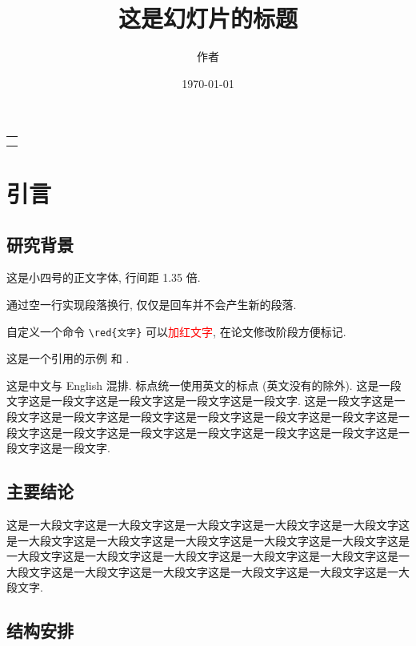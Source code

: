\documentclass[UTF8,openany]{ctexbook}
\title{这是幻灯片的标题}
\author{作者}
\date{\today}
\makeatletter
\numberwithin{equation}{chapter}
\numberwithin{figure}{chapter}
\numberwithin{table}{chapter}
\renewcommand*{\maketitle}{
  \begin{titlepage}
  \thispagestyle{plain}
  \setcounter{page}{0}
  \vspace*{2.5\baselineskip}
  \begin{center}
    {\bfseries\huge \@title}
  \end{center}
  \vspace*{1\baselineskip}
  \begin{center}
    \Large\kaishu
    \begin{tabular}{c}
    \@author \\[5pt]
    \@date \\
    \end{tabular}
  \end{center}
  \vfill
\end{titlepage}
\restoregeometry
}
\theoremstyle{mystyle}
\newcommand{\red}[1]{\textcolor{red}{#1}}
\makeatother
\begin{document}

\maketitle


\tableofcontents
\clearpage



\chapter{引言}

\section{研究背景}\label{sec:1-1}

这是小四号的正文字体, 行间距 1.35 倍.

通过空一行实现段落换行, 仅仅是回车并不会产生新的段落.

自定义一个命令 \verb|\red{文字}| 可以\red{加红文字}, 在论文修改阶段方便标记.

这是一个引用的示例 \cite{Tadmor2012} 和 \cite{LiLiu1997,Adams2003,TreWei2014}.

这是中文与 English 混排. 标点统一使用英文的标点 (英文没有的除外). 这是一段文字这是一段文字这是一段文字这是一段文字这是一段文字. 这是一段文字这是一段文字这是一段文字这是一段文字这是一段文字这是一段文字这是一段文字这是一段文字这是一段文字这是一段文字这是一段文字这是一段文字这是一段文字这是一段文字这是一段文字.

\section{主要结论}\label{sec:1-2}

这是一大段文字这是一大段文字这是一大段文字这是一大段文字这是一大段文字这是一大段文字这是一大段文字这是一大段文字这是一大段文字这是一大段文字这是一大段文字这是一大段文字这是一大段文字这是一大段文字这是一大段文字这是一大段文字这是一大段文字这是一大段文字这是一大段文字这是一大段文字这是一大段文字.


\section{结构安排}\label{sec:1-3}
\end{document}

